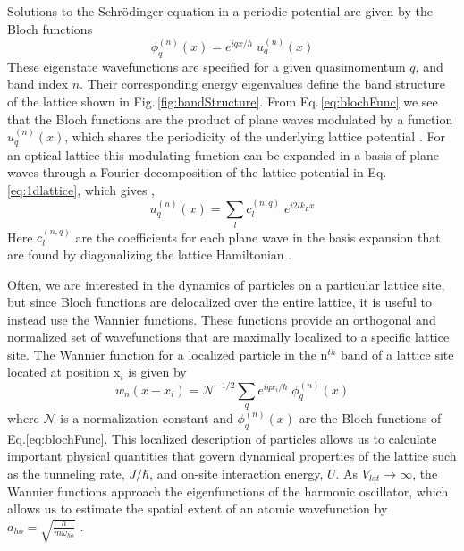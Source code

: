 Solutions to the Schr\"{o}dinger equation in a periodic potential are given by the Bloch functions \cite{Ashcroft1976}
	\begin{equation} \label{eq:blochFunc}
		 \phi_q^{(n)}(x) = e^{iqx/ \hbar} \; u_q^{(n)}(x)
	\end{equation}
These eigenstate wavefunctions are specified for a given quasimomentum $q$, and band index $n$. 
Their corresponding energy eigenvalues define the band structure of the lattice shown in Fig.\,\ref{fig:bandStructure}.
From Eq.\,\ref{eq:blochFunc} we see that the Bloch functions are the product of plane waves modulated by a function $u_q^{(n)}(x)$, which shares the periodicity of the underlying lattice potential \cite{Ashcroft1976}.
For an optical lattice this modulating function can be expanded in a basis of plane waves through a Fourier decomposition of the lattice potential in Eq.\,\ref{eq:1dlattice}, which gives \cite{MarkusGreiner2003},
	\begin{equation} \label{eq:blochMod}
		 u_q^{(n)}(x) = \sum_l c_l^{(n,q)} \; e^{i2lk_Lx}
	\end{equation}
Here $c_l^{(n,q)}$ are the coefficients for each plane wave in the basis expansion that are found by diagonalizing the lattice Hamiltonian \cite{MarkusGreiner2003}.

Often, we are interested in the dynamics of particles on a particular lattice site, but since Bloch functions are delocalized over the entire lattice, it is useful to instead use the Wannier functions. 
These functions provide an orthogonal and normalized set of wavefunctions that are maximally localized to a specific lattice site. 
The Wannier function for a localized particle in the n$^{th}$ band of a lattice site located at position x$_i$ is given by \cite{Jaksch2005}
	\begin{equation} \label{eq:wannier}
		 w_{n}(x - x_i) = \mathcal{N}^{-1/2} \sum_q e^{iqx_i/ \hbar} \; \phi_q^{(n)}(x)
	\end{equation}
where $\mathcal{N}$ is a normalization constant and $\phi_q^{(n)}(x)$ are the Bloch functions of Eq.\;\ref{eq:blochFunc}.
This localized description of particles allows us to calculate important physical quantities that govern dynamical properties of the lattice such as the tunneling rate, $J/ \hbar$, and on-site interaction energy, $U$. 
As $V_{lat}\!\rightarrow\!\infty$, the Wannier functions approach the eigenfunctions of the harmonic oscillator, which allows us to estimate the spatial extent of an atomic wavefunction by $a_{ho} = \sqrt{\frac{\hbar}{m \omega_{ho}}}$ \cite{Jaksch2005}.

